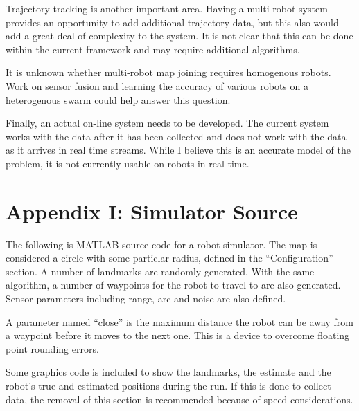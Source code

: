 \documentclass[12pt]{report}
\begin{document}
Trajectory tracking is another important area. Having a multi robot
system provides an opportunity to add additional trajectory data, but
this also would add a great deal of complexity to the system. It is
not clear that this can be done within the current framework and may
require additional algorithms.

It is unknown whether multi-robot map joining requires homogenous
robots. Work on sensor fusion and learning the accuracy of various
robots on a heterogenous swarm could help answer this question.

Finally, an actual on-line system needs to be developed. The current
system works with the data after it has been collected and does not
work with the data as it arrives in real time streams. While I believe
this is an accurate model of the problem, it is not currently usable
on robots in real time.

\chapter{Appendix I: Simulator Source}
The following is MATLAB source code for a robot simulator.  The map is
considered a circle with some particlar radius, defined in the
``Configuration'' section.  A number of landmarks are randomly
generated. With the same algorithm, a number of waypoints for the
robot to travel to are also generated.  Sensor parameters including
range, arc and noise are also defined. 

 A parameter named ``close'' is
the maximum distance the robot can be away from a waypoint before it
moves to the next one.  This is a device to overcome floating point
rounding errors.

Some graphics code is included to show the landmarks, the estimate and
the robot's true and estimated positions during the run.  If this is
done to collect data, the removal of this section is recommended
because of speed considerations.
\end{document}
